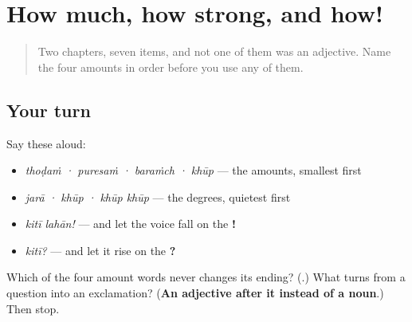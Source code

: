 \section[\texorpdfstring{\mr{थोडं} · \mr{पुरेसं} · \mr{बरंच} … (thoḍaṁ · puresaṁ …)}{थोडं · पुरेसं · बरंच … (thoḍaṁ · puresaṁ …)}]{How much, how strong, and how!}

\label{lesson:MR-R54-how-much}



\begin{quote}
Two chapters, seven items, and not one of them was an adjective. Name the four amounts in order before you use any of them.
\end{quote}

\subsection*{Your turn}
Say these aloud:

\begin{itemize}
\raggedright
  \item \emph{thoḍaṁ · puresaṁ · baraṁch · khūp} — the amounts, smallest first
  \item \emph{jarā · khūp · khūp khūp} — the degrees, quietest first
  \item \emph{kitī lahān!} — and let the voice fall on the \textbf{!}
  \item \emph{kitī?} — and let it rise on the \textbf{?}
\end{itemize}

\begin{tcolorbox}[breakable,colback=teal!4,colframe=teal!35!black,title={Before you move on}]
Which of the four amount words never changes its ending? (\textbf{}.) What turns \textbf{} from a question into an exclamation? (\textbf{An adjective after it instead of a noun}.) Then stop.
\end{tcolorbox}
